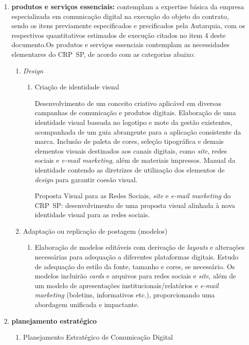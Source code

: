 \documentclass[oneside,a4paper,article]{memoir}
\begin{document}
\begin{enumerate}
	\item \textbf{produtos e serviços essenciais:} contemplam a expertise básica da
	      empresa especializada em comunicação digital na execução do objeto do
	      contrato, sendo os itens previamente especificados e precificados pela
	      Autarquia, com os respectivos quantitativos estimados de execução
	      citados no item 4 deste documento.\newline Os produtos e serviços essenciais contemplam as necessidades
 elementares do CRP~SP, de acordo com as categorias abaixo:
    \begin{enumerate}
	    \item
	    \textit{Design}
 \begin{enumerate}
	 \item
	 Criação de identidade visual

 Desenvolvimento de um conceito criativo aplicável em diversas campanhas de comunicação e produtos digitais. Elaboração de uma identidade visual baseada no logotipo e mote da gestão existentes, acompanhada de um guia abrangente para a aplicação consistente da marca. Inclusão de paleta de cores, seleção tipográfica e demais elementos visuais destinados aos canais digitais, como \textit{site}, redes sociais e \textit{e-mail marketing}, além de materiais impressos. Manual da identidade contendo as diretrizes de utilização dos elementos de \textit{design} para garantir coesão visual.

 Proposta Visual para as Redes Sociais, \textit{site} e \textit{e-mail marketing} do CRP~SP: desenvolvimento de uma proposta visual alinhada à nova identidade visual para as redes sociais.
 \end{enumerate}
      \item
	     Adaptação ou replicação de postagem (modelos)
 \begin{enumerate}
 \item
 Elaboração de modelos editáveis com derivação de \textit{layouts} e alterações necessárias para adequação a diferentes plataformas digitais. Estudo de adequação do estilo da fonte, tamanho e cores, se necessário. Os modelos incluirão \textit{cards} e arquivos para redes sociais e \textit{site}, além de um modelo de apresentações institucionais/relatórios e \textit{e-mail marketing} (boletins,  informativos etc.), proporcionando uma abordagem unificada e impactante.
 \end{enumerate}
    \end{enumerate}
	\item
	\textbf{planejamento estratégico}
		\begin{enumerate}
			\item
	      	Planejamento Estratégico de Comunicação Digital


\end{enumerate}
\end{enumerate}
\end{document}
